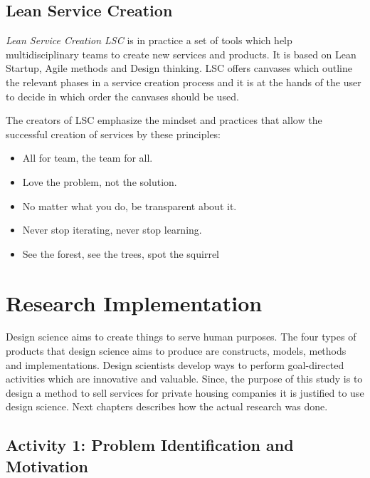 \subsection{Lean Service Creation}

\emph{Lean Service Creation LSC} is in practice a set of tools which help multidisciplinary teams to create new services and products. It is based on Lean Startup, Agile methods and Design thinking. LSC offers canvases which outline the relevant phases in a service creation process and it is at the hands of the user to decide in which order the canvases should be used.

The creators of LSC emphasize the mindset and practices that allow the successful creation of services by these principles:
\begin{itemize}
	\setlength{\itemsep}{2pt}
	\item All for team, the team for all.
	\item Love the problem, not the solution.
	\item No matter what you do, be transparent about it.
	\item Never stop iterating, never stop learning.
	\item See the forest, see the trees, spot the squirrel
\end{itemize} \parencite{LSC}

\section{Research Implementation}
\label{section:research-implementation}

Design science aims to create things to serve human purposes. The four types of products that design science aims to produce are constructs, models, methods and implementations. Design scientists develop ways to perform goal-directed activities which are innovative and valuable. \parencite{Salvatore:1995} Since, the purpose of this study is to design a method to sell services for private housing companies it is justified to use design science. Next chapters describes how the actual research was done.

\subsection{Activity 1: Problem Identification and Motivation}

